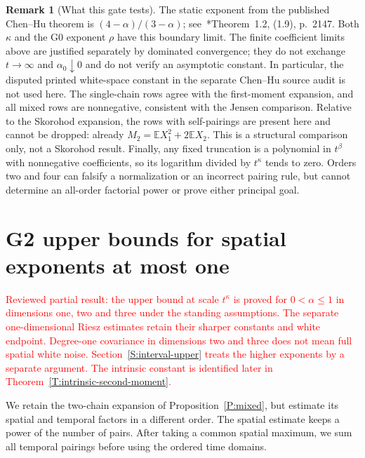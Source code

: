 \documentclass[12pt]{article}
\numberwithin{equation}{section}
\theoremstyle{definition}
\newtheorem{remark}[theorem]{Remark}
\newcommand{\E}{\mathbb{E}}
\newcommand{\myCmts}[1]{\begin{framed}\noindent\textcolor{red}{#1}\end{framed}}
\begin{document}
\begin{remark}[What this gate tests]\label{R:G1-scope}
  The static exponent from the published Chen--Hu theorem is
  $(4-\alpha)/(3-\alpha)$; see~\cite{chen.hu:25:hyperbolic}*{Theorem~1.2,
  (1.9), p.~2147}. Both $\kappa$ and the G0 exponent $\rho$ have this
  boundary limit. The finite coefficient limits above are justified
  separately by dominated convergence; they do not exchange
  $t\to\infty$ and $\alpha_0\downarrow0$ and do not verify an
  asymptotic constant. In particular, the disputed printed white-space
  constant in the separate Chen--Hu source audit is not used here.
  The single-chain rows agree with the first-moment expansion, and all
  mixed rows are nonnegative, consistent with the Jensen comparison.
  Relative to the Skorohod expansion, the rows with self-pairings are present
  here and cannot be dropped: already $M_2=\E X_1^2+2\E X_2$.
  This is a structural comparison only, not a Skorohod result.
  Finally, any fixed truncation is a polynomial in $t^\beta$ with
  nonnegative coefficients, so its logarithm divided by $t^\kappa$
  tends to zero. Orders two and four can falsify a normalization or an
  incorrect pairing rule, but cannot determine an all-order factorial
  power or prove either principal goal.
\end{remark}

\section{G2 upper bounds for spatial exponents at most one}\label{S:d1-upper}

\myCmts{Reviewed partial result: the upper bound at scale $t^\kappa$
is proved for $0<\alpha\le1$ in dimensions one, two and three under
the standing assumptions. The separate one-dimensional Riesz
estimates retain their sharper constants and white endpoint.
Degree-one covariance in dimensions two and three does not mean
full spatial white noise. Section~\ref{S:interval-upper} treats the
higher exponents by a separate argument. The intrinsic constant is
identified later in Theorem~\ref{T:intrinsic-second-moment}.}

We retain the two-chain expansion of Proposition~\ref{P:mixed}, but
estimate its spatial and temporal factors in a different order. The
spatial estimate keeps a power of the number of pairs. After taking a
common spatial maximum, we sum all temporal pairings before using the
ordered time domains.
\end{document}
